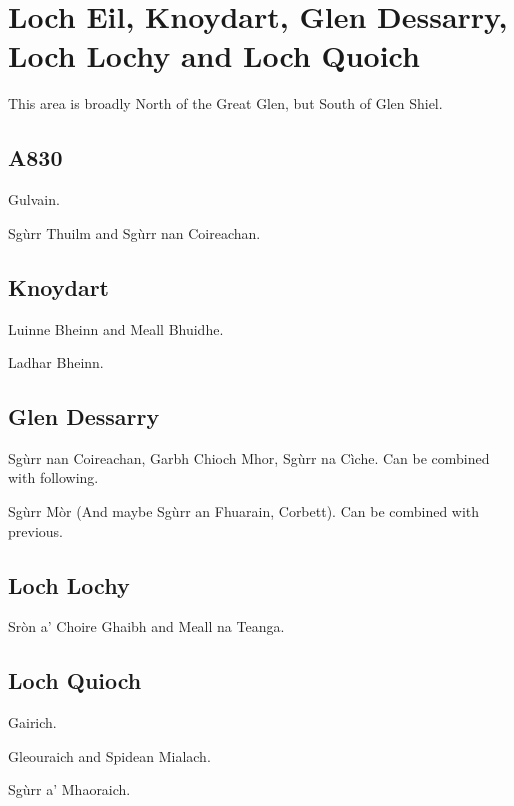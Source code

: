 \section{Loch Eil, Knoydart, Glen Dessarry, Loch Lochy and Loch Quoich}

This area is broadly North of the Great Glen, but South of Glen Shiel. 

\subsection{A830}

\begin{munros}
\item
Gulvain.

\item
Sgùrr Thuilm and Sgùrr nan Coireachan.
\end{munros}


\subsection{Knoydart}

\begin{munros}
\item
Luinne Bheinn and Meall Bhuidhe.

\item
Ladhar Bheinn.
\end{munros}


\subsection{Glen Dessarry}

\begin{munros}
\item
Sgùrr nan Coireachan, Garbh Chioch Mhor, Sgùrr na Cìche.  Can be combined with
following. 

\item
Sgùrr Mòr (And maybe Sgùrr an Fhuarain, Corbett).  Can be combined with
previous. 
\end{munros}


\subsection{Loch Lochy}

\begin{munros}
\item
Sròn a' Choire Ghaibh and Meall na Teanga.
\end{munros}


\subsection{Loch Quioch}

\begin{munros}
\item
Gairich.

\item
Gleouraich and Spidean Mialach.

\item
Sgùrr a' Mhaoraich.
\end{munros}
